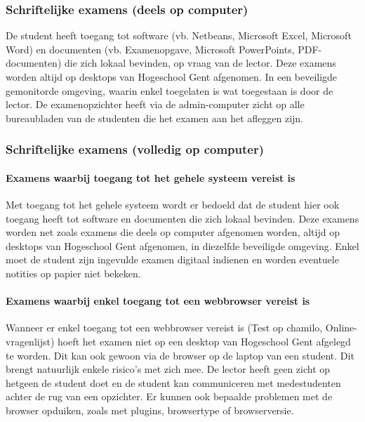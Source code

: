 \subsubsection{Schriftelijke examens (deels op computer) }

De student heeft toegang tot software (vb. Netbeans, Microsoft Excel, Microsoft Word) en documenten (vb. Examenopgave, Microsoft PowerPoints, PDF-documenten) die zich lokaal bevinden, op vraag van de lector. Deze examens worden altijd op desktops van Hogeschool Gent afgenomen. In een beveiligde gemonitorde omgeving, waarin enkel toegelaten is wat toegestaan is door de lector. De examenopzichter heeft via de admin-computer zicht op alle bureaubladen van de studenten die het examen aan het afleggen zijn. 




\subsubsection{Schriftelijke examens (volledig op computer)}

\paragraph{Examens waarbij toegang tot het gehele systeem vereist is}

Met toegang tot het gehele systeem wordt er bedoeld dat de student hier ook toegang heeft tot software  en documenten die zich lokaal bevinden. Deze examens worden net zoals examens die deels op computer afgenomen worden, altijd op desktops van Hogeschool Gent afgenomen, in diezelfde beveiligde omgeving. Enkel moet de student zijn ingevulde examen digitaal indienen en worden eventuele notities op papier niet bekeken.  

\paragraph{Examens waarbij enkel toegang tot een webbrowser vereist is}

Wanneer er enkel toegang tot een webbrowser vereist is (Test op chamilo, Online-vragenlijst) hoeft het examen niet op een desktop van Hogeschool Gent afgelegd te worden. Dit kan ook gewoon via de browser op de laptop van een student. Dit brengt natuurlijk enkele risico's met zich mee. De lector heeft geen zicht op hetgeen de student doet en de student kan communiceren met medestudenten achter de rug van een opzichter. Er kunnen ook bepaalde problemen met de browser opduiken, zoals met plugins, browsertype of browserversie. 

